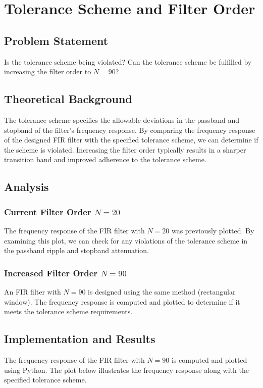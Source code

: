 \item[(f)]
\section{Tolerance Scheme and Filter Order}

\subsection*{Problem Statement}
Is the tolerance scheme being violated? Can the tolerance scheme be fulfilled by increasing the filter order to \( N = 90 \)?

\subsection*{Theoretical Background}
The tolerance scheme specifies the allowable deviations in the passband and stopband of the filter's frequency response. By comparing the frequency response of the designed FIR filter with the specified tolerance scheme, we can determine if the scheme is violated. Increasing the filter order typically results in a sharper transition band and improved adherence to the tolerance scheme.

\subsection*{Analysis}

\subsubsection*{Current Filter Order \( N = 20 \)}
The frequency response of the FIR filter with \( N = 20 \) was previously plotted. By examining this plot, we can check for any violations of the tolerance scheme in the passband ripple and stopband attenuation.

\subsubsection*{Increased Filter Order \( N = 90 \)}
An FIR filter with \( N = 90 \) is designed using the same method (rectangular window). The frequency response is computed and plotted to determine if it meets the tolerance scheme requirements.

\subsection*{Implementation and Results}
The frequency response of the FIR filter with \( N = 90 \) is computed and plotted using Python. The plot below illustrates the frequency response along with the specified tolerance scheme.

